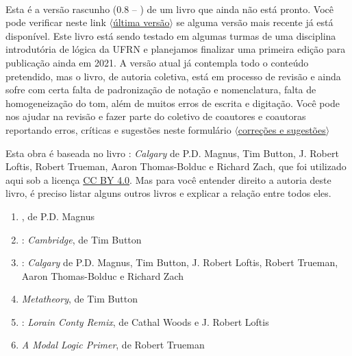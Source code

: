 \newpage

\thispagestyle{empty}
\onecolumn
\ 
\vfill

\parbox{3 in}{
Esta é a versão rascunho (0.8 -- \mydate) de um livro que ainda não está pronto.
Você pode verificar neste link
\href{https://github.com/Grupo-de-Estudos-em-Logica-da-UFRN/Para-Todxs-Natal/blob/main/paratodxsnatal.pdf}{$\langle$última versão$\rangle$}
se alguma versão mais recente já está disponível.
Este livro está sendo testado em algumas turmas de uma disciplina introdutória de lógica da UFRN e planejamos finalizar uma primeira edição para publicação ainda em 2021. 
A versão atual já contempla todo o conteúdo pretendido, mas o livro, de autoria coletiva, está em processo de revisão e ainda sofre com certa falta de padronização de notação e nomenclatura, falta de homogeneização do tom, além de muitos erros de escrita e digitação.
Você pode nos ajudar na revisão e fazer parte do coletivo de coautores e coautoras reportando erros, críticas e sugestões neste formulário
\href{https://forms.gle/yd4yH9WAo6TxAiSj8}{$\langle$correções e sugestões$\rangle$}
}

\newpage

\noindent Esta obra é baseada no livro \forallx: \textit{Calgary} de P.D. Magnus, Tim Button, J. Robert Loftis, Robert Trueman, Aaron Thomas-Bolduc e Richard Zach, que foi utilizado aqui sob a licença \href{https://creativecommons.org/licenses/by/4.0/}{CC BY 4.0}.
Mas para você entender direito a autoria deste livro, é preciso listar alguns outros livros e explicar a relação entre todos eles.

\begin{enumerate}
   \item \forallx, de P.D. Magnus

   \item \forallx: \textit{Cambridge}, de Tim Button

   \item \forallx: \textit{Calgary} de P.D. Magnus, Tim Button, J. Robert Loftis, Robert Trueman, Aaron Thomas-Bolduc e Richard Zach
   
   \item \textit{Metatheory}, de Tim Button
   
   \item  \forallx: \textit{Lorain Conty Remix}, de Cathal Woods e J. Robert Loftis
   
   \item \textit{A Modal Logic Primer}, de Robert Trueman
\end{enumerate}

